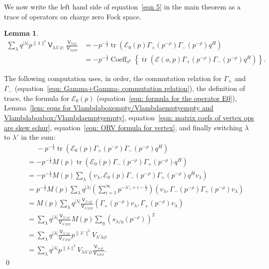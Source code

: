 \documentclass[12pt]{amsart}
\newcommand{\Vsf}{\mathsf{V}}
\newcommand{\bx}{\square}
\renewcommand{\emptyset}{\varnothing}
\newcommand{\half}{\frac{1}{2}}
\newtheorem{lemma}[theorem]{Lemma}
\theoremstyle{definition}
\newcommand{\tr}{\operatorname{tr}}
\newcommand{\E}{\mathcal{E}}
\newcommand{\ptotheminusrho}{p^{-\rho}}
\begin{document}
We now write the left hand side of equation~\eqref{eqn 5} in the main
theorem as a trace of operators on charge zero Fock space.
\begin{lemma}\label{lem: eqn 5 written as a trace}
\begin{align*}
\sum_{\lambda} q^{|\lambda |} p^{\| \lambda \| ^{2}} \Vsf_{\lambda
\lambda' \emptyset}\,\, \frac{\Vsf_{\lambda \bx
\emptyset}}{\Vsf_{\lambda \emptyset \emptyset}}& = -p^{-\half} \tr
\left(\E
_0(p)\Gamma_{+}(\ptotheminusrho )\Gamma_{-}(\ptotheminusrho )q^{H} \right)\\
& =- p^{-\half} \operatorname{Coeff}_{a^{0}}\left\{\tr
\left(\E(a,p)\Gamma_{+}(\ptotheminusrho )\Gamma_{-}(\ptotheminusrho
)q^{H} \right) \right\}.
\end{align*}
\end{lemma}
\proof The following computation uses, in order, the commutation
relation for $\Gamma_{+}$ and $\Gamma_{-}$ (equation~\eqref{eqn:
Gamma+Gamma- commutation relation}), the definition of trace, the
formula for $\E_{0} (p)$ (equation~\eqref{eqn: formula for the
operator E0}), Lemma~\ref{lem: eqns for
Vlambdaboxempty/Vlambdaemptyempty and
Vlambdaboxbox/Vlambdaemptyempty}, equation~\eqref{eqn: matrix coefs of
vertex ops are skew schur}, equation~\eqref{eqn: ORV formula for
vertex}, and finally switching $\lambda$ to $\lambda '$ in the sum:
\begin{align*}
\quad &\,\, \quad - p^{-\half} \tr \left(\E_{0}(p)\Gamma_{+}(\ptotheminusrho )\Gamma_{-}(\ptotheminusrho )q^{H} \right)\\
& =- p^{-\half} M(p) \tr \left(\E_{0}(p)\Gamma_{-}(\ptotheminusrho )\Gamma_{+}(\ptotheminusrho )q^{H} \right)\\
&=-p^{-\half}M(p)\sum_{\lambda} \left(v_{\lambda}, \E_{0}(p)\Gamma_{-}(\ptotheminusrho )\Gamma_{+}(\ptotheminusrho )q^{H} v_{\lambda}\right)\\
&=p^{-\half }M(p) \sum_{\lambda} q^{|\lambda |}
\left(\sum_{i=1}^{\infty}
p^{-\lambda'_{i}+i-\half} \right) \left(v_{\lambda}, \Gamma_{-}(\ptotheminusrho )\Gamma_{+}(\ptotheminusrho )v_{\lambda} \right)\\
&=M(p)\sum_{\lambda}q^{|\lambda |} \frac{\Vsf_{\lambda' \bx
\emptyset}}{\Vsf_{\lambda' \emptyset \emptyset}} \left(\Gamma_{+}(\ptotheminusrho )v_{\lambda },\Gamma_{+}(\ptotheminusrho )v_{\lambda } \right)\\
&= \sum_{\lambda} q^{|\lambda |} \frac{\Vsf_{\lambda' \bx
\emptyset}}{\Vsf_{\lambda' \emptyset \emptyset}} M(p)\sum_{\eta} \left(s_{\lambda /\eta}(\ptotheminusrho ) \right)^{2}\\
&= \sum_{\lambda} q^{|\lambda |} \frac{\Vsf_{\lambda' \bx
\emptyset}}{\Vsf_{\lambda' \emptyset \emptyset}} p^{\| \lambda' \| ^{2}}
V_{\lambda '\lambda \emptyset}\\
&= \sum_{\lambda} q^{|\lambda |}  p^{\| \lambda \| ^{2}}
V_{\lambda \lambda' \emptyset} \frac{\Vsf_{\lambda \bx
\emptyset}}{\Vsf_{\lambda \emptyset \emptyset}}.
\end{align*}
\qed 
\end{document}
